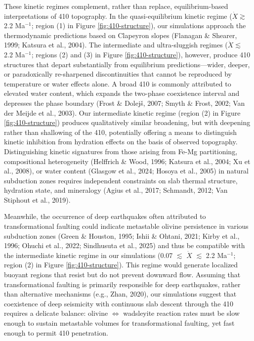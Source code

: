 \documentclass[draft,linenumbers]{agujournal2019}
\begin{document}
These kinetic regimes complement, rather than replace, equilibrium-based
interpretations of 410 topography. In the quasi-equilibrium kinetic
regime (\(\dot{X} \gtrsim\) 2.2 Ma\(^{-1}\); region (1) in Figure
\ref{fig:410-structure}), our simulations approach the thermodynamic
predictions based on Clapeyron slopes (Flanagan \& Shearer, 1999;
{Katsura et al.}, 2004). The intermediate and ultra-sluggish regimes
(\(\dot{X} \lesssim\) 2.2 Ma\(^{-1}\); regions (2) and (3) in Figure
\ref{fig:410-structure}), however, produce 410 structures that depart
substantially from equilibrium predictions---wider, deeper, or
paradoxically re-sharpened discontinuities that cannot be reproduced by
temperature or water effects alone. A broad 410 is commonly attributed
to elevated water content, which expands the two-phase coexistence
interval and depresses the phase boundary (Frost \& Dolejš, 2007; Smyth
\& Frost, 2002; Van der Meijde et al., 2003). Our intermediate kinetic
regime (region (2) in Figure \ref{fig:410-structure}) produces
qualitatively similar broadening, but with deepening rather than
shallowing of the 410, potentially offering a means to distinguish
kinetic inhibition from hydration effects on the basis of observed
topography. Distinguishing kinetic signatures from those arising from
Fe-Mg partitioning, compositional heterogeneity (Helffrich \& Wood,
1996; {Katsura et al.}, 2004; Xu et al., 2008), or water content
(Glasgow et al., 2024; Hosoya et al., 2005) in natural subduction zones
requires independent constraints on slab thermal structure, hydration
state, and mineralogy (Agius et al., 2017; Schmandt, 2012; Van Stiphout
et al., 2019).

Meanwhile, the occurrence of deep earthquakes often attributed to
transformational faulting could indicate metastable olivine persistence
in various subduction zones (Green \& Houston, 1995; Ishii \& Ohtani,
2021; Kirby et al., 1996; Ohuchi et al., 2022; Sindhusuta et al., 2025)
and thus be compatible with the intermediate kinetic regime in our
simulations (0.07 \(\lesssim\) \(\dot{X}\) \(\lesssim\) 2.2 Ma\(^{-1}\);
region (2) in Figure \ref{fig:410-structure}). This regime would
generate localized buoyant regions that resist but do not prevent
downward flow. Assuming that transformational faulting is primarily
responsible for deep earthquakes, rather than alternative mechanisms
(e.g., Zhan, 2020), our simulations suggest that coexistence of deep
seismicity with continuous slab descent through the 410 requires a
delicate balance: olivine \(\Leftrightarrow\) wadsleyite reaction rates
must be slow enough to sustain metastable volumes for transformational
faulting, yet fast enough to permit 410 penetration.
\end{document}
